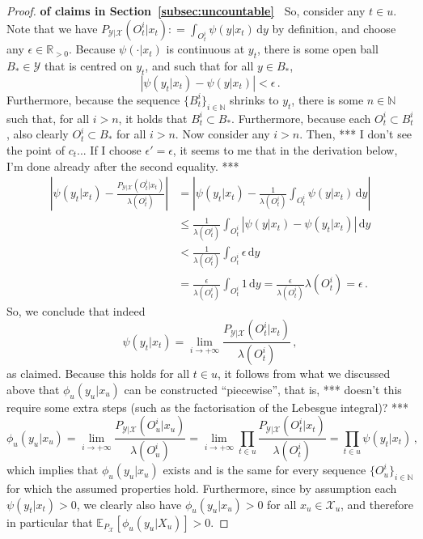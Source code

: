 \documentclass[twoside,11pt]{article}
\newcommand{\nats}{\mathbb{N}}
\newcommand{\reals}{\mathbb{R}}
\newcommand{\realspos}{\reals_{>0}}
\newcommand{\states}{\mathcal{X}}
\newcommand{\observs}{\mathcal{Y}}
\newcommand{\abs}[1]{\left\vert #1 \right\vert}
\newcommand{\coloneqq}{:\!=}
\begin{document}
\begin{proof}{\bf of claims in Section~\ref{subsec:uncountable}~}
So, consider any $t\in u$. Note that we have $P_{\observs\vert\states}(O_t^i\vert x_t)\coloneqq \int_{O_t^i}\psi(y\vert x_t)\,\mathrm{d}y$ by definition, and choose any $\epsilon\in\realspos$. Because $\psi(\cdot\vert x_t)$ is continuous at $y_t$, there is some open ball $B_*\in\observs$ that is centred on $y_t$, and such that for all $y\in B_*$,
\begin{equation*}
\abs{\psi(y_t\vert x_t) - \psi(y\vert x_t)} < \epsilon\,.
\end{equation*}
Furthermore, because the sequence $\{B_t^i\}_{i\in\nats}$ shrinks to $y_t$, there is some $n\in\nats$ such that, for all $i>n$, it holds that $B_t^i\subset B_*$. Furthermore, because each $O_t^i\subset B_t^i$, also clearly $O_t^i\subset B_*$ for all $i>n$. Now consider any $i>n$. Then, *** I don't see the point of $c_t$... If I choose $\epsilon'=\epsilon$, it seems to me that in the derivation below, I'm done already after the second equality. ***
\begin{align*}
\abs{\psi(y_t\vert x_t) - \frac{P_{\observs\vert\states}(O_t^i\vert x_t)}{\lambda(O_t^i)}} &= \abs{\psi(y_t\vert x_t) - \frac{1}{\lambda(O_t^i)}\int_{O_t^i}\psi(y\vert x_t)\,\mathrm{d}y} \\
 &\leq \frac{1}{\lambda(O_t^i)}\int_{O_t^i}\abs{\psi(y\vert x_t) - \psi(y_t\vert x_t)}\,\mathrm{d}y \\
 &< \frac{1}{\lambda(O_t^i)}\int_{O_t^i}\epsilon\,\mathrm{d}y\\
 &= \frac{\epsilon}{\lambda(O_t^i)}\int_{O_t^i}1\,\mathrm{d}y 
 = \frac{\epsilon}{\lambda(O_t^i)}\lambda(O_t^i)
 = \epsilon\,.
\end{align*}
So, we conclude that indeed
\begin{equation*}
\psi(y_t\vert x_t) = \lim_{i\to+\infty}\frac{P_{\observs\vert\states}(O_t^i\vert x_t)}{\lambda(O_t^i)}\,,
\end{equation*}
as claimed. Because this holds for all $t\in u$, it follows from what we discussed above that $\phi_u(y_u\vert x_u)$ can be constructed ``piecewise'', that is, *** doesn't this require some extra steps (such as the factorisation of the Lebesgue integral)? ***
\begin{equation*}
\phi_u(y_u\vert x_u) = \lim_{i\to+\infty}\frac{P_{\observs\vert\states}(O_u^i\vert x_u)}{\lambda(O_u^i)} = \lim_{i\to+\infty}\prod_{t\in u}\frac{P_{\observs\vert\states}(O_t^i\vert x_t)}{\lambda(O_t^i)} = \prod_{t\in u}\psi(y_t\vert x_t)\,,
\end{equation*}
which implies that $\phi_u(y_u\vert x_u)$ exists and is the same for every sequence $\{O_u^i\}_{i\in\nats}$ for which the assumed properties hold. Furthermore, since by assumption each $\psi(y_t\vert x_t)>0$, we clearly also have $\phi_u(y_u\vert x_u)>0$ for all $x_u\in\states_u$, and therefore in particular that $\mathbb{E}_{P_\states}[\phi_u(y_u\vert X_u)]>0$. 


\end{proof}
\end{document}
